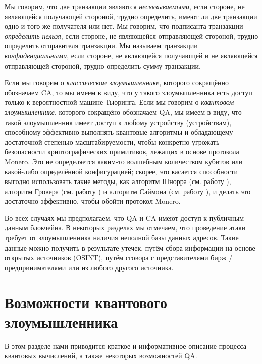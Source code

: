 \documentclass{mrl}
\begin{document}
Мы говорим, что две транзакции являются \textit{несвязываемыми}, если стороне, не являющейся получающей стороной, трудно определить, имеют ли две транзакции одно и того же получателя или нет. Мы говорим, что подписанта транзакции \textit{определить нельзя}, если стороне, не являющейся отправляющей стороной, трудно определить отправителя транзакции. Мы называем транзакции \textit{конфиденциальными}, если стороне, не являющейся получающей и не являющейся отправляющей стороной, трудно определить сумму транзакции.

Если мы говорим о \textit{классическом злоумышленнике}, которого сокращённо обозначаем CA, то мы имеем в виду, что у такого злоумышленника есть доступ только к вероятностной машине Тьюринга. Если мы говорим о \textit{квантовом злоумышленнике}, которого сокращёно обозначаем QA, мы имеем в виду, что такой злоумышленник имеет доступ к любому устройству (устройствам), способному эффективно выполнять квантовые алгоритмы и обладающему достаточной степенью масштабируемости, чтобы конкретно угрожать безопасности криптографических примитивов, лежащих в основе протокола Monero. Это не определяется каким-то волшебным количеством кубитов или какой-либо определённой конфигурацией; скорее, это касается способности выгодно использовать такие методы, как алгоритм Шнорра (см. работу \cite{Shor1994algorithms}), алгоритм Гровера (см. работу \cite{grover1996fast}) и алгоритм Саймона (см. работу \cite{simon1997power}), и делать это достаточно эффективно, чтобы обойти протокол Monero.

Во всех случаях мы предполагаем, что QA и CA имеют доступ к публичным данным блокчейна. В некоторых разделах мы отмечаем, что проведение атаки требует от злоумышленника наличия неполной базы данных адресов. Такие данные можно получить в результате утечек, путём сбора информации на основе открытых источников (OSINT), путём сговора с представителями бирж / предпринимателями или из любого другого источника.

\section{Возможности квантового злоумышленника}

В этом разделе нами приводится краткое и информативное описание процесса квантовых вычислений, а также некоторых возможностей QA.
\end{document}
